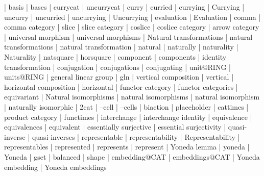     |   basis
    |   bases
    |   currycat
    |   uncurrycat
    |   curry
    |   curried
    |   currying
    |   Currying
    |   uncurry
    |   uncurried
    |   uncurrying
    |   Uncurrying
    |   evaluation
    |   Evaluation
    |   comma
    |   comma category
    |   slice
    |   slice category
    |   coslice
    |   coslice category
    |   arrow category
    |   universal morphism
    |   universal morphisms
    |   Natural transformations
    |   natural transformations
    |   natural transformation
    |   natural
    |   naturally
    |   naturality
    |   Naturality
    |   natsquare
    |   horsquare
    |   component
    |   components
    |   identity transformation
    |   conjugation
    |   conjugations
    |   conjugating
    |   unit@RING
    |   units@RING
    |   general linear group
    |   gln
    |   vertical composition
    |   vertical
    |   horizontal composition
    |   horizontal
    |   functor category
    |   functor categories
    |   equivariant
    |   Natural isomorphisms
    |   natural isomorphisms
    |   natural isomorphism
    |   naturally isomorphic
    |   2cat
    |   --cell
    |   --cells
    |   biaction
    |   placeholder
    |   cattimes
    |   product category
    |   functimes
    |   interchange
    |   interchange identity
    |   equivalence
    |   equivalences
    |   equivalent
    |   essentially surjective
    |   essential surjectivity
    |   quasi-inverse
    |   quasi-inverses
    |   representable
    |   representability
    |   Representability
    |   representables
    |   represented
    |   represents
    |   represent
    |   Yoneda lemma
    |   yoneda
    |   Yoneda
    |   gset
    |   balanced
    |   shape
    |   embedding@CAT
    |   embeddings@CAT
    |   Yoneda embedding
    |   Yoneda embeddings

